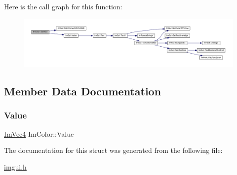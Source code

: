 Here is the call graph for this function\+:
\nopagebreak
\begin{figure}[H]
\begin{center}
\leavevmode
\includegraphics[width=350pt]{struct_im_color_afcff20160db703b956d56e5a9fa88e24_cgraph}
\end{center}
\end{figure}


\subsection{Member Data Documentation}
\mbox{\label{struct_im_color_a4cf43bd58e30decaa0248f839fc85e95}} 
\subsubsection{\texorpdfstring{Value}{Value}}
{\footnotesize\ttfamily \mbox{\hyperlink{struct_im_vec4}{Im\+Vec4}} Im\+Color\+::\+Value}



The documentation for this struct was generated from the following file\+:\begin{DoxyCompactItemize}
\item 
\mbox{\hyperlink{imgui_8h}{imgui.\+h}}\end{DoxyCompactItemize}
